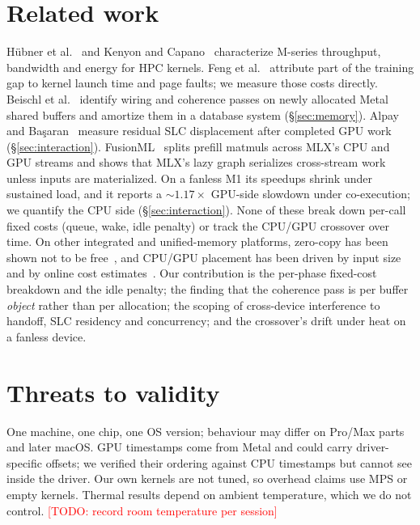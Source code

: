\documentclass[conference,10pt]{IEEEtran}
\newcommand{\todo}[1]{\textcolor{red}{[TODO: #1]}}
\newcommand{\todo}[1]{}
\begin{document}
\section{Related work}

Hübner et al.~\cite{huebner2025apple} and Kenyon and Capano~\cite{kenyon2022apple} characterize M-series throughput,
bandwidth and energy for HPC kernels. Feng et al.~\cite{feng2025profiling} attribute part of the training gap to kernel
launch time and page faults; we measure those costs directly. Beischl et al.~\cite{beischl2026damon} identify wiring and
coherence passes on newly allocated Metal shared buffers and amortize them in a database system
(\S\ref{sec:memory}). Alpay and Ba\c{s}aran~\cite{residualcache} measure residual SLC displacement after completed
GPU work (\S\ref{sec:interaction}). FusionML~\cite{fusionml} splits prefill matmuls across MLX's CPU and GPU streams
and shows that MLX's lazy graph serializes cross-stream work unless inputs are materialized. On a fanless M1 its
speedups shrink under sustained load, and it reports a ${\sim}1.17\times$ GPU-side slowdown under co-execution;
we quantify the CPU side (\S\ref{sec:interaction}). None of these break down per-call fixed costs (queue, wake,
idle penalty) or track the CPU/GPU crossover over time. On other integrated and unified-memory
platforms, zero-copy has been shown not to be free~\cite{otterness2017jetson}, and CPU/GPU placement has been driven by
input size~\cite{qilin} and by online cost estimates~\cite{mnn,codl}. Our contribution is the per-phase fixed-cost breakdown and the idle penalty; the finding that the coherence pass
is per buffer \emph{object} rather than per allocation; the scoping of cross-device interference to handoff, SLC
residency and concurrency; and the crossover's drift under heat on a fanless device.

\section{Threats to validity}

One machine, one chip, one OS version; behaviour may differ on Pro/Max parts and later macOS. GPU timestamps come from
Metal and could carry driver-specific offsets; we verified their ordering against CPU timestamps but cannot see
inside the driver. Our own kernels are not tuned, so overhead claims use MPS or empty kernels. Thermal results depend
on ambient temperature, which we do not control. \todo{record room temperature per session}
\end{document}
